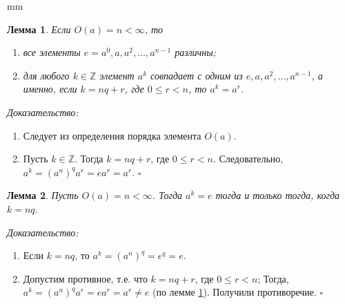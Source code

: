 \documentclass[12pt,english,russian]{article}
\newtheorem{lemma}{Лемма}
\begin{document}
		 mm
	\begin{lemma}
	\label{lemma1}
		Если $O(a) = n < \infty$, то
		\begin{enumerate}
			\item все элементы $e = a^0,a,a^2,\dots ,a^{n-1}$ различны;
			\item для любого $k \in \mathbb{Z}$ элемент $a^k$ совпадает с одним из
			$e,a,a^2,\dots ,a^{n-1}$, а именно, если $k=nq+r$, где
			$0 \leq r < n$, то $a^k=a^r$.
		\end{enumerate}
	\end{lemma}
	\textit{Доказательство:}
	\begin{enumerate}
		\item Следует из определения порядка элемента $O(a)$.
		\item Пусть $k \in \mathbb{Z}$. Тогда $k=nq+r$, где $0 \leq r < n$. 
		Следовательно, $a^k = (a^n)^qa^r = ea^r = a^r$. \quad $\square$
	\end{enumerate}
	
	\begin{lemma}
	\label{lemma2}
		Пусть $O(a) = n < \infty$. Тогда $a^k = e$ тогда и только тогда, когда $k = nq$.
	\end{lemma}
	\textit{Доказательство:}
	\begin{enumerate}
		\item Если  $k = nq$, то $a^k = (a^n)^q = e^q = e$.
		\item Допустим противное, т.е. что $k=nq+r$, где $0 \leq r < n$; 
		Тогда, $a^k = (a^n)^qa^r = ea^r = a^r\ne e$ (по лемме \ref{lemma1}).  Получили противоречие. \quad $\square$
	\end{enumerate}
	
\end{document}
